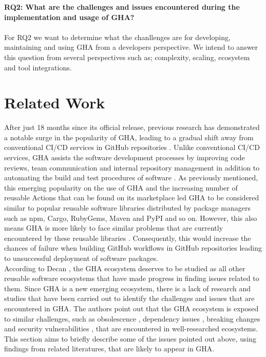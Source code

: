 \documentclass[conference]{IEEEtran}
\begin{document}
     \textbf{RQ2: What are the challenges and issues encountered during the implementation and usage of GHA?}\\\\
        For RQ2 we want to determine what the chanllenges are for developing, maintaining and using GHA from a developers perspective. We intend to answer this question from several perspectives such as; complexity, scaling, ecosystem and tool integrations.




\section{Related Work}
    After just 18 months since its official release, previous research has demonstrated a notable surge in the popularity of GHA, leading to a gradual shift away from conventional CI/CD services in GitHub repositories \cite{golzadeh2021rise}. Unlike conventional CI/CD services, GHA assists the software development processes by improving code reviews, team communication and internal repository management in addition to automating the build and test procedures of software \cite{chandrasekara2021hands}. As previously mentioned, this emerging popularity on the use of GHA and the increasing number of reusable Actions that can be found on its marketplace led GHA to be considered similar to popular reusable software libraries distributed by package managers such as npm, Cargo, RubyGems, Maven and PyPI and so on. However, this also means GHA is more likely to face similar problems that are currently encountered by these reusable libraries \cite{decan2022use}. Consequently, this would increase the chances of failure when building GitHub workflows in GitHub repositories leading to unsuccessful deployment of software packages. \\

    According to Decan \cite{decan2022use}, the GHA ecosystem deserves to be studied as all other reusable software ecosystems that have made progress in finding issues related to them. Since GHA is a new emerging ecosystem, there is a lack of research and studies that have been carried out to identify the challenges and issues that are encountered in GHA. The authors point out that the GHA ecosystem is exposed to similar challenges, such as obsolescence \cite{decan2018evolution} \cite{cogo2021deprecation}, dependency issues \cite{decan2019empirical} \cite{soto2021comprehensive} \cite{decan2019package}, breaking changes \cite{dietrich2019dependency}\cite{decan2018impact} and security vulnerabilities \cite{zimmermann2019small} \cite{kula2018developers}, that are encountered in well-researched ecosystems. This section aims to briefly describe some of the issues pointed out above, using findings from related literatures, that are likely to appear in GHA.
\end{document}
